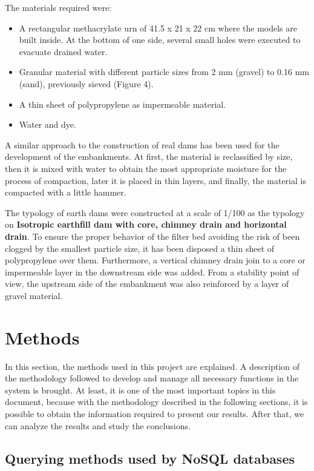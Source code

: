 The materials required were:  

\begin{itemize}
 \item A rectangular methacrylate urn of 41.5 x 21 x 22 cm where the models are built inside. At the 
bottom of one side, several small holes were executed to evacuate drained water. 
 \item Granular material with different particle sizes from 2 mm (gravel) to 0.16 mm (sand), previously 
sieved (Figure 4). 
 \item A thin sheet of polypropylene as impermeable material. 
 \item Water and dye.
\end{itemize}


A similar approach to the construction of real dams has been used for the development  of  the  embankments.  At  first,  the  material  is  reclassified  by  size,  then  it  is  mixed  with water to obtain the most appropriate moisture for the process of compaction, later it is placed in thin 
layers, and finally, the material is compacted with a little hammer. 

The typology  of  earth  dams  were  constructed  at  a  scale  of  1/100  as the typology on  \textbf{Isotropic  earthfill  dam  with  core,  chimney  drain  and  horizontal  drain}. To ensure the proper behavior of the filter bed avoiding the risk of been clogged by the smallest particle size, it has been disposed a thin sheet of polypropylene over them. Furthermore, a vertical chimney drain join to a core or impermeable layer 
in the downstream side was added. From a stability point of view, the upstream side of the embankment was also reinforced by a layer of gravel material. 

\section{Methods}

In this section, the methods used in this project are explained. A description of the methodology followed to develop and manage all necessary functions in the system is brought. At least, it is one of the most important topics in this document, because with the methodology described in the following sections, it is possible to obtain the information required to present our results. After that, we can analyze the results and study the conclusions.

\subsection{Querying methods used by NoSQL databases}

